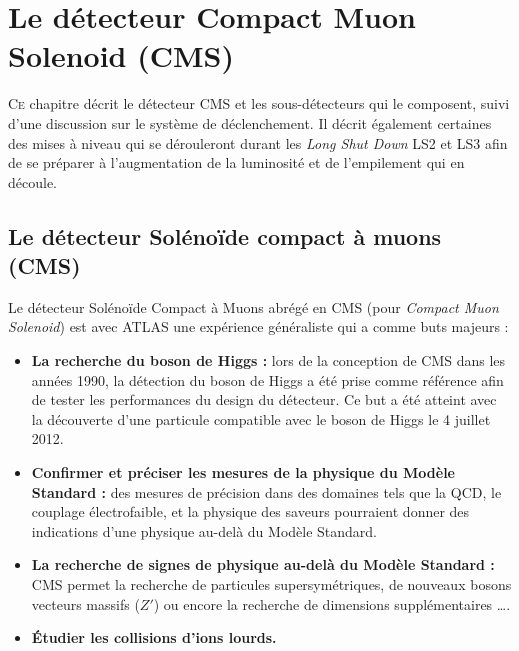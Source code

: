 \chapter{Le détecteur Compact Muon Solenoid (CMS)}
\renewcommand\chapterillustration{CMS/cms.jpeg}
\ThisULCornerWallPaper{1}{\chapterillustration}
\minitoc

\lettrine[lines=4, slope=-0.5em]{C}{e} chapitre décrit le détecteur CMS et les sous-détecteurs qui le composent, suivi d'une discussion sur le système de déclenchement. Il décrit également certaines des mises à niveau qui se dérouleront durant les \textit{Long Shut Down} LS2 et LS3 afin de se préparer à l'augmentation de la luminosité et de l'empilement qui en découle.

\section{Le détecteur Solénoïde compact à muons (CMS)}
Le détecteur Solénoïde Compact à Muons abrégé en CMS (pour \textit{Compact Muon Solenoid}) est avec ATLAS une expérience généraliste qui a comme buts majeurs :

\begin{itemize}[label=$\bullet$]
	\item \textbf{La recherche du boson de Higgs : } lors de la conception de CMS dans les années \num{1990}, la détection du boson de Higgs a été prise comme référence afin de tester les performances du design du détecteur. Ce but a été atteint avec la découverte d'une particule compatible avec le boson de Higgs le \num{4} juillet \num{2012}.
	\item \textbf{Confirmer et préciser les mesures de la physique du Modèle Standard : } des mesures de précision dans des domaines tels que la QCD, le couplage électrofaible, et la physique des saveurs pourraient donner des indications d'une physique au-delà du Modèle Standard.
	\item \textbf{La recherche de signes de physique au-delà du Modèle Standard : }CMS permet la recherche de particules supersymétriques, de nouveaux bosons vecteurs massifs ($Z'$) ou encore la recherche de dimensions supplémentaires \ldots.
	\item \textbf{Étudier les collisions d'ions lourds.}
\end{itemize}

